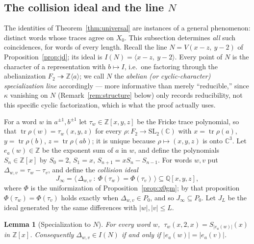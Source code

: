 \documentclass[11pt,a4paper]{article}
\newtheorem{lemma}[theorem]{Lemma}
\theoremstyle{definition}
\theoremstyle{remark}
\newcommand{\tr}{\operatorname{tr}}
\newcommand{\SLtwo}{\mathrm{SL}_2(\mathbb{C})}
\newcommand{\Q}{\mathbb{Q}}
\newcommand{\Z}{\mathbb{Z}}
\begin{document}
\subsection{The collision ideal and the line $N$}
\label{sec:collision}

The identities of Theorem~\ref{thm:universal} are instances of a general
phenomenon: distinct words whose traces agree on $X_0$. This subsection
determines \emph{all} such coincidences, for words of every length. Recall
the line $N = V(x-z,\ y-2)$ of Proposition~\ref{prop:jd}; its ideal is
$I(N)=\langle x-z,\ y-2\rangle$. Every point of $N$ is the character of a
representation with $b\mapsto I$, i.e.\ one factoring through the
abelianization $F_2\twoheadrightarrow\Z\langle a\rangle$; we call $N$ the
\emph{abelian (or cyclic-character) specialization line} accordingly ---
more informative than merely ``reducible,'' since $\kappa$ vanishing on
$N$ (Remark~\ref{rem:structure} below) only records reducibility, not
this specific cyclic factorization, which is what the proof actually uses.

For a word $w$ in $a^{\pm1},b^{\pm1}$ let $\tau_w\in\Z[x,y,z]$ be the
Fricke trace polynomial, so that $\tr\rho(w)=\tau_w(x,y,z)$ for every
$\rho:F_2\to\SLtwo$ with $x=\tr\rho(a)$, $y=\tr\rho(b)$, $z=\tr\rho(ab)$;
it is unique because $\rho\mapsto(x,y,z)$ is onto $\mathbb{C}^3$. Let
$e_a(w)\in\Z$ be the exponent sum of $a$ in $w$, and define the
polynomials $S_n\in\Z[x]$ by $S_0=2$, $S_1=x$, $S_{n+1}=xS_n-S_{n-1}$.
For words $w,v$ put $\Delta_{w,v}=\tau_w-\tau_v$, and define the
\emph{collision ideal}
\begin{equation}
J_\infty=\bigl\langle\,\Delta_{w,v}\ :\ \Phi(\tau_w)=\Phi(\tau_v)\,\bigr\rangle
\subseteq\Q[x,y,z],
\end{equation}
where $\Phi$ is the uniformization of Proposition~\ref{prop:x0gm}; by that
proposition $\Phi(\tau_w)=\Phi(\tau_v)$ holds exactly when
$\Delta_{w,v}\in P_0$, and so $J_\infty\subseteq P_0$. Let $J_L$ be the
ideal generated by the same differences with $|w|,|v|\le L$.

\begin{lemma}[Specialization to $N$]
\label{lem:nexp}
For every word $w$, $\ \tau_w(x,2,x)=S_{|e_a(w)|}(x)$ in $\Z[x]$.
Consequently $\Delta_{w,v}\in I(N)$ if and only if $|e_a(w)|=|e_a(v)|$.
\end{lemma}
\end{document}
